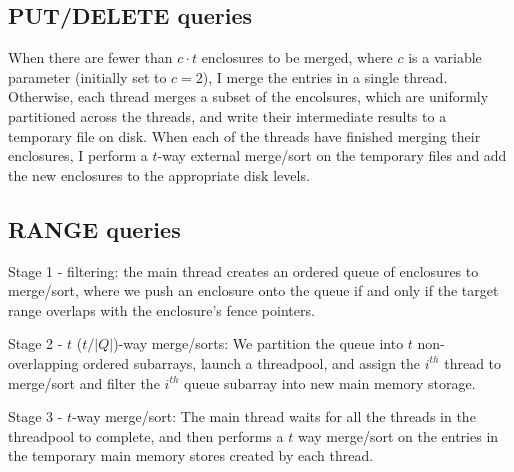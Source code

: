\documentclass[format=acmtog, review=false]{acmart}
\begin{document}
\subsection{PUT/DELETE queries}

When there are fewer than $c\cdot t$ enclosures to be merged, where $c$ is a variable parameter (initially set to $c=2$), I merge the entries in a single thread. Otherwise, each thread merges a subset of the encolsures, which are uniformly partitioned across the threads, and write their intermediate results to a temporary file on disk. When each of the threads have finished merging their enclosures, I perform a $t$-way external merge/sort on the temporary files and add the new enclosures to the appropriate disk levels.

\subsection{RANGE queries}

Stage 1 - filtering: the main thread creates an ordered queue of enclosures to merge/sort, where we push an enclosure onto the queue if and only if the target range overlaps with the enclosure's fence pointers.

Stage 2 - $t$ ($t/|Q|$)-way merge/sorts: We partition the queue into $t$ non-overlapping ordered subarrays, launch a threadpool, and assign the $i^{th}$ thread to merge/sort and filter the $i^{th}$ queue subarray into new main memory storage.

Stage 3 - $t$-way merge/sort: The main thread waits for all the threads in the threadpool to complete, and then performs a $t$ way merge/sort on the entries in the temporary main memory stores created by each thread.
\end{document}
